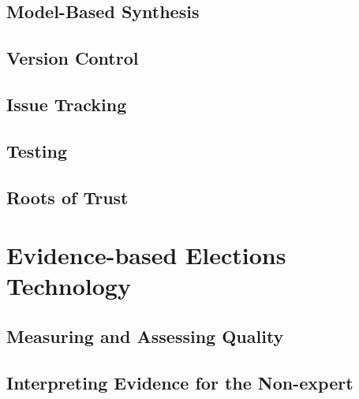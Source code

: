 \subsection{Model-Based Synthesis}

\subsection{Version Control}

\subsection{Issue Tracking}

\subsection{Testing}

\subsection{Roots of Trust}

\section{Evidence-based Elections Technology}

\subsection{Measuring and Assessing Quality}

\subsection{Interpreting Evidence for the Non-expert}

